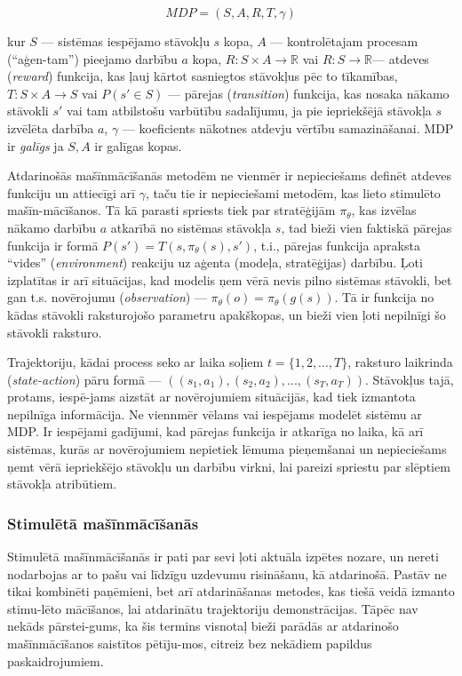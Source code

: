 \documentclass[12pt, a4paper]{article}
\numberwithin{equation}{section} %
\begin{document}
\begin{equation} 
    MDP = (S,A,R,T, \gamma)
\end{equation}

kur $S$ --- sistēmas iespējamo stāvokļu $s$ kopa, $A$ --- kontrolētajam procesam (``aģen-tam'') pieejamo darbību $a$ kopa, $R: S \times A \rightarrow \mathbb{R}$ vai $R: S \rightarrow \mathbb{R}$--- atdeves (\textit{reward}) funkcija, kas ļauj kārtot sasniegtos stāvokļus pēc to tīkamības, $T: S \times A \rightarrow S$ vai $P(s' \in S)$ --- pārejas (\textit{transition}) funkcija, kas nosaka nākamo stāvokli $s'$ vai tam atbilstošu varbūtību sadalījumu, ja pie iepriekšējā stāvokļa $s$ izvēlēta darbība $a$, $\gamma$ --- koeficients nākotnes atdevju vērtību samazināšanai. MDP ir \textit{galīgs} ja $S,A$ ir galīgas kopas. 

Atdarinošās mašīnmācīšanās metodēm ne vienmēr ir nepieciešams definēt atdeves funkciju un attiecīgi arī $\gamma$, taču tie ir nepieciešami metodēm, kas lieto stimulēto mašīn-mācīšanos. Tā kā parasti spriests tiek par stratēģijām $\pi_{\theta}$, kas izvēlas nākamo darbību $a$ atkarībā no sistēmas stāvokļa $s$, tad bieži vien faktiskā pārejas funkcija ir formā $P(s') = T(s, \pi_{\theta}(s), s')$, t.i., pārejas funkcija apraksta ``vides'' (\textit{environment}) reakciju uz aģenta (modeļa, stratēģijas) darbību. Ļoti izplatītas ir arī situācijas, kad modelis ņem vērā nevis pilno sistēmas stāvokli, bet gan t.s. novērojumu (\textit{observation}) --- $\pi_{\theta}(o)=\pi_{\theta}(g(s))$. Tā ir funkcija no kādas stāvokli raksturojošo parametru apakškopas, un bieži vien ļoti nepilnīgi šo stāvokli raksturo. 

Trajektoriju, kādai process seko ar laika soļiem $t = \lbrace 1, 2, ..., T \rbrace$, raksturo laikrinda (\textit{state-action}) pāru formā --- $((s_1, a_1), (s_2, a_2), ..., (s_T, a_T))$. Stāvokļus tajā, protams, iespē-jams aizstāt ar novērojumiem situācijās, kad tiek izmantota nepilnīga informācija. Ne viennmēr vēlams vai iespējams modelēt sistēmu ar MDP. Ir iespējami gadījumi, kad pārejas funkcija ir atkarīga no laika, kā arī sistēmas, kurās ar novērojumiem nepietiek lēmuma pieņemšanai un nepieciešams ņemt vērā iepriekšējo stāvokļu un darbību virkni, lai pareizi spriestu par slēptiem stāvokļa atribūtiem.

\subsubsection{Stimulētā mašīnmācīšanās}

Stimulētā mašīnmācīšanās ir pati par sevi ļoti aktuāla izpētes nozare, un nereti nodarbojas ar to pašu vai līdzīgu uzdevumu risināšanu, kā atdarinošā. Pastāv ne tikai kombinēti paņēmieni\cite{gupta2019relay}\cite{brown2019extrapolating}, bet arī atdarināšanas metodes, kas tiešā veidā izmanto stimu-lēto mācīšanos, lai atdarinātu trajektoriju demonstrācijas\cite{englert2018learning}. Tāpēc nav nekāds pārstei-gums, ka šis termins visnotaļ bieži parādās ar atdarinošo mašīnmācīšanos saistītos pētīju-mos, citreiz bez nekādiem papildus paskaidrojumiem.
\end{document}
